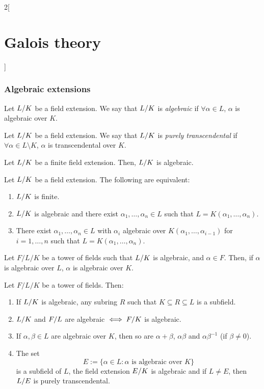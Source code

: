 \documentclass[../../../main.tex]{subfiles}
\begin{document}
\begin{multicols}{2}[\section{Galois theory}]
  \subsubsection{Algebraic extensions}
  \begin{definition}
    Let $\quot{L}{K}$ be a field extension. We say that $\quot{L}{K}$ is \textit{algebraic} if $\forall\alpha\in L$, $\alpha$ is algebraic over $K$.
  \end{definition}
  \begin{definition}
    Let $\quot{L}{K}$ be a field extension. We say that $\quot{L}{K}$ is \textit{purely transcendental} if $\forall\alpha\in L\setminus K$, $\alpha$ is transcendental over $K$.
  \end{definition}
  \begin{lemma}
    Let $\quot{L}{K}$ be a finite field extension. Then, $\quot{L}{K}$ is algebraic.
  \end{lemma}
  \begin{prop}
    Let $\quot{L}{K}$ be a field extension. The following are equivalent:
    \begin{enumerate}
      \item $\quot{L}{K}$ is finite.
      \item $\quot{L}{K}$ is algebraic and there exist $\alpha_1,\ldots,\alpha_n\in L$ such that $L=K(\alpha_1,\ldots,\alpha_n)$.
      \item There exist $\alpha_1,\ldots,\alpha_n\in L$ with $\alpha_i$ algebraic over $K(\alpha_1,\ldots,\alpha_{i-1})$ for $i=1,\ldots,n$ such that $L=K(\alpha_1,\ldots,\alpha_n)$.
    \end{enumerate}
  \end{prop}
  \begin{prop}
    Let $F/L/K$ be a tower of fields such that $\quot{L}{K}$ is algebraic, and $\alpha\in F$. Then, if $\alpha$ is algebraic over $L$, $\alpha$ is algebraic over $K$.
  \end{prop}
  \begin{prop}
    Let $F/L/K$ be a tower of fields. Then:
    \begin{enumerate}
      \item If $\quot{L}{K}$ is algebraic, any subring $R$ such that $K\subseteq R\subseteq L$ is a subfield.
      \item $\quot{L}{K}$ and $\quot{F}{L}$ are algebraic $\iff\quot{F}{K}$ is algebraic.
      \item If $\alpha,\beta\in L$ are algebraic over $K$, then so are $\alpha+\beta$, $\alpha\beta$ and $\alpha\beta^{-1}$ (if $\beta\ne 0$).
      \item The set $$E:=\{\alpha\in L:\alpha\text{ is algebraic over }K\}$$ is a subfield of $L$, the field extension $\quot{E}{K}$ is algebraic and if $L\ne E$, then $\quot{L}{E}$ is purely transcendental.
    \end{enumerate}
  \end{prop}

\end{multicols}
\end{document}
